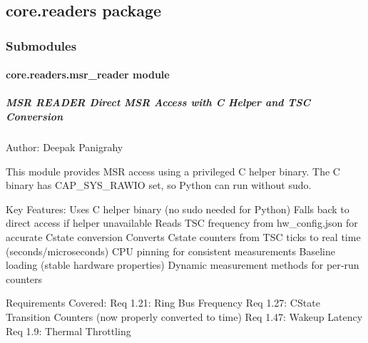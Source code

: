 \documentclass[letterpaper,10pt,english]{sphinxmanual}
\begin{document}
\subsection{core.readers package}
\label{\detokenize{core.readers:core-readers-package}}\label{\detokenize{core.readers::doc}}

\subsubsection{Submodules}
\label{\detokenize{core.readers:submodules}}
\sphinxstepscope


\paragraph{core.readers.msr\_reader module}
\label{\detokenize{core.readers.msr_reader:module-core.readers.msr_reader}}\label{\detokenize{core.readers.msr_reader:core-readers-msr-reader-module}}\label{\detokenize{core.readers.msr_reader::doc}}

\subparagraph{MSR READER \sphinxhyphen{} Direct MSR Access with C Helper and TSC Conversion}
\label{\detokenize{core.readers.msr_reader:msr-reader-direct-msr-access-with-c-helper-and-tsc-conversion}}
\sphinxAtStartPar
Author: Deepak Panigrahy

\sphinxAtStartPar
This module provides MSR access using a privileged C helper binary.
The C binary has CAP\_SYS\_RAWIO set, so Python can run without sudo.

\sphinxAtStartPar
Key Features:
\sphinxhyphen{} Uses C helper binary (no sudo needed for Python)
\sphinxhyphen{} Falls back to direct access if helper unavailable
\sphinxhyphen{} Reads TSC frequency from hw\_config.json for accurate C\sphinxhyphen{}state conversion
\sphinxhyphen{} Converts C\sphinxhyphen{}state counters from TSC ticks to real time (seconds/microseconds)
\sphinxhyphen{} CPU pinning for consistent measurements
\sphinxhyphen{} Baseline loading (stable hardware properties)
\sphinxhyphen{} Dynamic measurement methods for per‑run counters

\sphinxAtStartPar
Requirements Covered:
\sphinxhyphen{} Req 1.21: Ring Bus Frequency
\sphinxhyphen{} Req 1.27: C\sphinxhyphen{}State Transition Counters (now properly converted to time)
\sphinxhyphen{} Req 1.47: Wake\sphinxhyphen{}up Latency
\sphinxhyphen{} Req 1.9: Thermal Throttling
\end{document}

